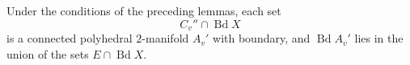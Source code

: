 Under the conditions of the preceding lemmas, each set
$$C_v'' \cap \operatorname{Bd} X$$
is a connected polyhedral $2$-manifold $A_v'$ with boundary, and $\operatorname{Bd} A_v'$ lies in the union of the sets $E \cap \operatorname{Bd} X$.

